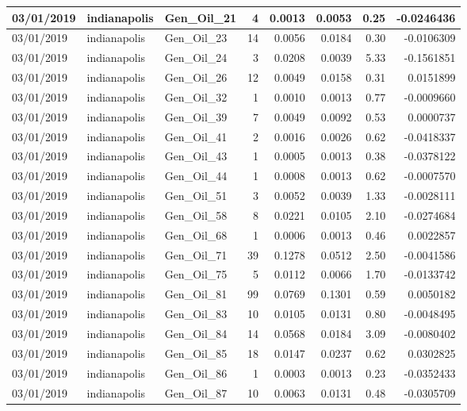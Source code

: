 \documentclass[
  letterpaper,
  DIV=11,
  numbers=noendperiod]{scrartcl}
\begin{document}
\begin{tabular}{l|l|l|r|r|r|r|r}
\hline
03/01/2019 & indianapolis & Gen\_Oil\_21 & 4 & 0.0013 & 0.0053 & 0.25 & -0.0246436\\
\hline
03/01/2019 & indianapolis & Gen\_Oil\_23 & 14 & 0.0056 & 0.0184 & 0.30 & -0.0106309\\
\hline
03/01/2019 & indianapolis & Gen\_Oil\_24 & 3 & 0.0208 & 0.0039 & 5.33 & -0.1561851\\
\hline
03/01/2019 & indianapolis & Gen\_Oil\_26 & 12 & 0.0049 & 0.0158 & 0.31 & 0.0151899\\
\hline
03/01/2019 & indianapolis & Gen\_Oil\_32 & 1 & 0.0010 & 0.0013 & 0.77 & -0.0009660\\
\hline
03/01/2019 & indianapolis & Gen\_Oil\_39 & 7 & 0.0049 & 0.0092 & 0.53 & 0.0000737\\
\hline
03/01/2019 & indianapolis & Gen\_Oil\_41 & 2 & 0.0016 & 0.0026 & 0.62 & -0.0418337\\
\hline
03/01/2019 & indianapolis & Gen\_Oil\_43 & 1 & 0.0005 & 0.0013 & 0.38 & -0.0378122\\
\hline
03/01/2019 & indianapolis & Gen\_Oil\_44 & 1 & 0.0008 & 0.0013 & 0.62 & -0.0007570\\
\hline
03/01/2019 & indianapolis & Gen\_Oil\_51 & 3 & 0.0052 & 0.0039 & 1.33 & -0.0028111\\
\hline
03/01/2019 & indianapolis & Gen\_Oil\_58 & 8 & 0.0221 & 0.0105 & 2.10 & -0.0274684\\
\hline
03/01/2019 & indianapolis & Gen\_Oil\_68 & 1 & 0.0006 & 0.0013 & 0.46 & 0.0022857\\
\hline
03/01/2019 & indianapolis & Gen\_Oil\_71 & 39 & 0.1278 & 0.0512 & 2.50 & -0.0041586\\
\hline
03/01/2019 & indianapolis & Gen\_Oil\_75 & 5 & 0.0112 & 0.0066 & 1.70 & -0.0133742\\
\hline
03/01/2019 & indianapolis & Gen\_Oil\_81 & 99 & 0.0769 & 0.1301 & 0.59 & 0.0050182\\
\hline
03/01/2019 & indianapolis & Gen\_Oil\_83 & 10 & 0.0105 & 0.0131 & 0.80 & -0.0048495\\
\hline
03/01/2019 & indianapolis & Gen\_Oil\_84 & 14 & 0.0568 & 0.0184 & 3.09 & -0.0080402\\
\hline
03/01/2019 & indianapolis & Gen\_Oil\_85 & 18 & 0.0147 & 0.0237 & 0.62 & 0.0302825\\
\hline
03/01/2019 & indianapolis & Gen\_Oil\_86 & 1 & 0.0003 & 0.0013 & 0.23 & -0.0352433\\
\hline
03/01/2019 & indianapolis & Gen\_Oil\_87 & 10 & 0.0063 & 0.0131 & 0.48 & -0.0305709\\

\end{tabular}
\end{document}
